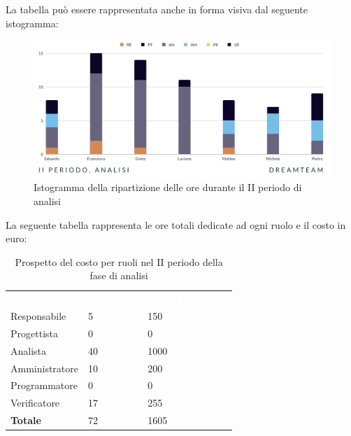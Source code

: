 La tabella può essere rappresentata anche in forma visiva dal seguente istogramma: 
\begin{figure}[H]
\centering
\includegraphics[scale=0.65]{Sezioni/SezioniPreventivo/grafici/Analisi_II_periodo.png}
\caption{Istogramma della ripartizione delle ore durante il II periodo di analisi}
\end{figure}

La seguente tabella rappresenta le ore totali dedicate ad ogni ruolo e il costo in euro:

\begin{table}[H]
\begin{center}
\renewcommand{\arraystretch}{1.5}
\begin{tabular}{ m{}<{\centering}  m{}<{\centering} m{}<{\centering}}
	\rowcolor{darkblue}
	\textcolor{white}{\textbf{Ruolo}}&\textcolor{white}{\textbf{Totale ore}}&\textcolor{white}{\textbf{Costo totale (\euro)}}\\ 

	Responsabile  & 5 & 150 \\	
	
	Progettista & 0 &  0 \\
	
	Analista & 40 & 1000 \\

	Amministratore & 10 & 200\\
	
	Programmatore & 0 &  0\\
	
	Verificatore & 17 & 255\\
	
	\textbf{Totale} & 72 &  1605 \\
	
\end{tabular}
\caption{Prospetto del costo per ruoli nel II periodo della fase di analisi}
\end{center}
\end{table}

